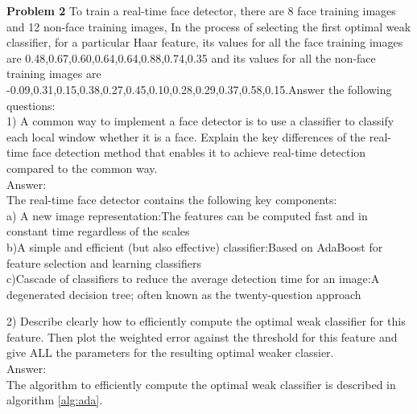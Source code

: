 \documentclass{article}
\begin{document}
\textbf{Problem 2} To train a real-time face detector, there are 8 face training images and 12 non-face training images, In the process of selecting the first optimal weak classifier, for a particular Haar feature, its values for all the face training images are 0.48,0.67,0.60,0.64,0.64,0.88,0.74,0.35 and its values for all the non-face training images are -0.09,0.31,0.15,0.38,0.27,0.45,0.10,0.28,0.29,0.37,0.58,0.15.Answer the following questions:\\

1) A common way to implement a face detector is to use a classifier to classify each local window whether it is a face. Explain the key differences of the real-time face detection method that enables it to achieve real-time detection compared to the common way.\\
Answer:\\
The real-time face detector contains the following key components:\\
a) A new image representation:The features can be computed fast and in constant time regardless of the scales\\
b)A simple and efficient (but also effective) classifier:Based on AdaBoost for feature selection and learning classifiers\\
c)Cascade of classifiers to reduce the average detection time for an image:A degenerated decision tree; often known as the twenty-question approach

2) Describe clearly how to efficiently compute the optimal weak classifier for this feature. Then plot the weighted error against the threshold for this feature and give ALL the parameters for the resulting optimal weaker classier.\\
Answer:\\
The algorithm to efficiently compute the optimal weak classifier is described in algorithm \ref{alg:ada}.
\end{document}
